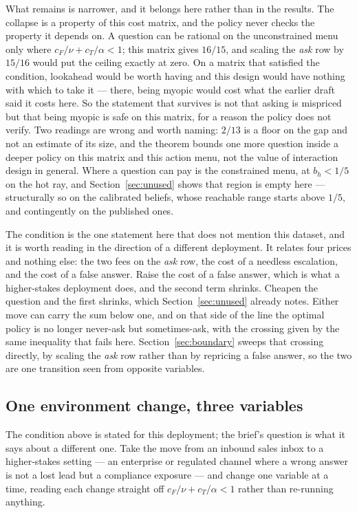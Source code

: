 \documentclass{article}
\begin{document}
What remains is narrower, and it belongs here rather than in the results. The
collapse is a property of this cost matrix, and the policy never checks the
property it depends on. A question can be rational on the unconstrained menu only
where $c_F/\nu + c_T/\alpha < 1$; this matrix gives $16/15$, and scaling the
\emph{ask} row by $15/16$ would put the ceiling exactly at zero. On a matrix that
satisfied the condition, lookahead would be worth having and this design would
have nothing with which to take it --- there, being myopic would cost what the
earlier draft said it costs here. So the statement that survives is not that
asking is mispriced but that being myopic is safe on this matrix, for a reason the
policy does not verify. Two readings are wrong and worth naming: $2/13$ is a floor
on the gap and not an estimate of its size, and the theorem bounds one more
question inside a deeper policy on this matrix and this action menu, not the value
of interaction design in general. Where a question can pay is the constrained
menu, at $b_h < 1/5$ on the hot ray, and Section~\ref{sec:unused} shows that
region is empty here --- structurally so on the calibrated beliefs, whose
reachable range starts above $1/5$, and contingently on the published ones.

The condition is the one statement here that does not mention this dataset, and it
is worth reading in the direction of a different deployment. It relates four prices
and nothing else: the two fees on the \emph{ask} row, the cost of a needless
escalation, and the cost of a false answer. Raise the cost of a false answer, which
is what a higher-stakes deployment does, and the second term shrinks. Cheapen the
question and the first shrinks, which Section~\ref{sec:unused} already notes.
Either move can carry the sum below one, and on that side of the line the optimal
policy is no longer never-ask but sometimes-ask, with the crossing given by the same
inequality that fails here. Section~\ref{sec:boundary} sweeps that crossing
directly, by scaling the \emph{ask} row rather than by repricing a false answer, so
the two are one transition seen from opposite variables.

\subsection{One environment change, three variables}
The condition above is stated for this deployment; the brief's question is what it
says about a different one. Take the move from an inbound sales inbox to a
higher-stakes setting --- an enterprise or regulated channel where a wrong answer
is not a lost lead but a compliance exposure --- and change one variable at a time,
reading each change straight off $c_F/\nu + c_T/\alpha < 1$ rather than re-running
anything.
\end{document}

